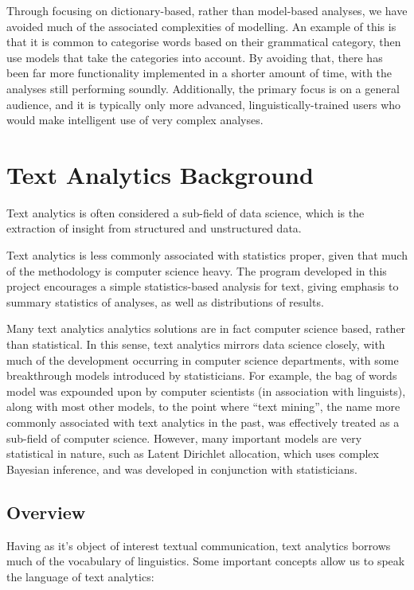 \message{ !name(jason-cairns-dissertation.tex)}\documentclass[11pt, a4paper, titlepage]{report}
\begin{document}
Through focusing on dictionary-based, rather than model-based
analyses, we have avoided much of the associated complexities of
modelling. An example of this is that it is common to categorise words
based on their grammatical category, then use models that take the
categories into account. By avoiding that, there has been far more
functionality implemented in a shorter amount of time, with the
analyses still performing soundly. Additionally, the primary focus is
on a general audience, and it is typically only more advanced,
linguistically-trained users who would make intelligent use of very
complex analyses.

\chapter{Text Analytics Background}\label{cha:text-analyt-backgr}

Text analytics is often considered a sub-field of data science, which
is the extraction of insight from structured and unstructured
data\autocite{rajman1998text}.

Text analytics is less commonly associated with statistics proper,
given that much of the methodology is computer science heavy. The
program developed in this project encourages a simple statistics-based
analysis for text, giving emphasis to summary statistics of analyses,
as well as distributions of results.

Many text analytics analytics solutions are in fact computer science
based, rather than statistical. In this sense, text analytics mirrors
data science closely, with much of the development occurring in
computer science departments, with some breakthrough models introduced
by statisticians. For example, the bag of words model was expounded
upon by computer scientists (in association with linguists), along
with most other models, to the point where ``text mining'', the name
more commonly associated with text analytics in the past, was
effectively treated as a sub-field of computer
science\autocite{ko2012study}. However, many important models are very
statistical in nature, such as Latent Dirichlet allocation, which uses
complex Bayesian inference, and was developed in conjunction with
statisticians\autocite{blei2003latent}.

\section{Overview}\label{sec:overview}

Having as it's object of interest textual communication, text
analytics borrows much of the vocabulary of linguistics. Some
important concepts allow us to speak the language of text analytics:
\end{document}

